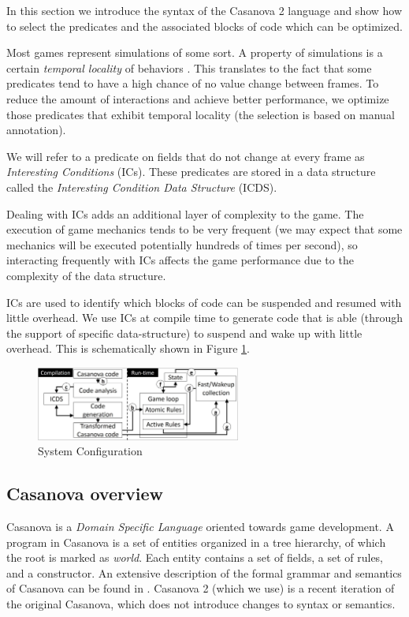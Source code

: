 In this section we introduce the syntax of the Casanova 2 language and show how to select the predicates and the associated blocks of code which can be optimized.

Most games represent simulations of some sort. A property of simulations is a certain \textit{temporal locality} of behaviors \cite{ai_dithering}. This translates to the fact that some predicates tend to have a high chance of no value change between frames. To reduce the amount of interactions and achieve better performance, we optimize those predicates that exhibit temporal locality (the selection is based on manual annotation).

We will refer to a predicate on fields that do not change at every frame as \textit{Interesting Conditions} (ICs). These predicates are stored in a data structure called the \textit{Interesting Condition Data Structure} (ICDS).

Dealing with ICs adds an additional layer of complexity to the game. The execution of game mechanics tends to be very frequent (we may expect that some mechanics will be executed potentially hundreds of times per second), so interacting frequently with ICs affects the game performance due to the complexity of the data structure.

ICs are used to identify which blocks of code can be suspended and resumed with little overhead. We use ICs at compile time to generate code that is able (through the support of specific data-structure) to suspend and wake up with little overhead. This is schematically shown in Figure \ref{fig:system_configuration}.

\begin{figure}[!h]
		\centering
         \includegraphics[width=0.6\textwidth]{Figures/system_description.jpg}
         \caption{System Configuration}
         \label{fig:system_configuration}
\end{figure}

\subsection{Casanova overview}
Casanova is a \textit{Domain Specific Language} oriented towards game development. A program in Casanova is a set of entities organized in a tree hierarchy, of which the root is marked as \textit{world}. Each entity contains a set of fields, a set of rules, and a constructor. An extensive description of the formal grammar and semantics of Casanova can be found in \cite{maggiore2013casanova}. Casanova 2 (which we use) is a recent iteration of the original Casanova, which does not introduce changes to syntax or semantics.

